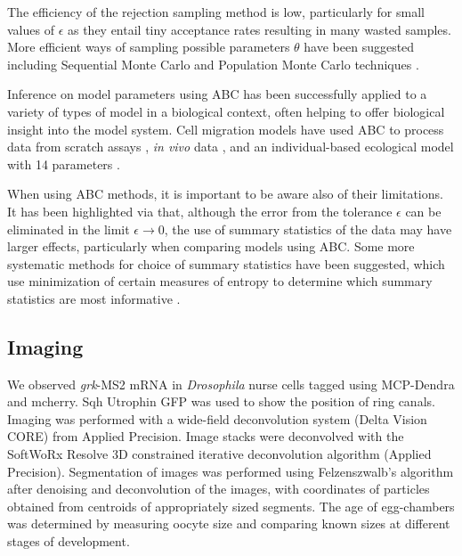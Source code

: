 \documentclass[twocolumn]{biophys}
\begin{document}
The efficiency of the rejection sampling method is low, particularly for small values of $\epsilon$ as they entail tiny acceptance rates resulting in many wasted samples. 
More efficient ways of sampling possible parameters $\theta$ have been suggested including Sequential Monte Carlo and Population Monte Carlo techniques \citep{toni2009approximate, sisson2007sequential, beaumont2009adaptive, lenormand2013adaptive}.

Inference on model parameters using ABC has been successfully applied to a variety of types of model in a biological context, often helping to offer biological insight into the model system.
Cell migration models have used ABC to process data from scratch assays \citep{johnston2014interpreting}, \textit{in vivo} data \citep{liepe2012calibrating}, and an individual-based ecological model with 14 parameters \citep{van2015calibration}. 

When using ABC methods, it is important to be aware also of their limitations. 
It has been highlighted via \citet{robert2011lack} that, although the error from the tolerance $\epsilon$ can be eliminated in the limit $\epsilon \rightarrow 0$, the use of summary statistics of the data may have larger effects, particularly when comparing models using ABC.
Some more systematic methods for choice of summary statistics have been suggested, which use minimization of certain measures of entropy to determine which summary statistics are most informative \citep{nunes2010optimal}.


\subsection{Imaging}
We observed \textit{grk}-MS2 mRNA in \textit{Drosophila} nurse cells tagged using MCP-Dendra and mcherry. 
Sqh Utrophin GFP was used to show the position of ring canals.
Imaging was performed with a wide-field deconvolution system (Delta Vision CORE) from Applied Precision. 
Image stacks were deconvolved with the SoftWoRx Resolve 3D constrained iterative deconvolution algorithm (Applied Precision). 
Segmentation of images was performed using Felzenszwalb's algorithm \citep{felzenszwalb2004efficient} after denoising and deconvolution of the images, with coordinates of particles obtained from centroids of appropriately sized segments. 
The age of egg-chambers was determined by measuring oocyte size and comparing known sizes at different stages of development.
\end{document}
